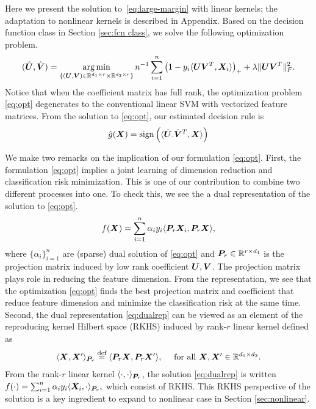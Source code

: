\documentclass[12pt]{article}
\begin{document}
Here we present the solution to~\eqref{eq:large-margin} with linear kernels; the adaptation to nonlinear kernels is described in Appendix. Based on the decision function class in Section \ref{sec:fcn class}, we solve the following optimization problem.
\begin{align}
\label{eq:opt}
(\hat {\bm{U}},\hat {\bm{V}}) = \operatorname*{arg\,min}_{\{(\bm{U},\bm{V})\in\mathbb{R}^{d_1\times r}\times \mathbb{R}^{d_2\times r}\}}n^{-1}\sum_{i=1}^n \left(1-y_i\langle \bm{U}\bm{V}^T,\bm X_i\rangle\right)_++\lambda \lVert\bm{U}\bm{V}^T\rVert_F^2.
\end{align}
Notice that when the coefficient matrix has full rank, the optimization problem \eqref{eq:opt} degenerates to the conventional linear SVM with vectorized feature matrices. From the solution to \eqref{eq:opt}, our estimated decision rule is \begin{align}\hat g(\bm X) = \text{sign}\left(\langle \hat{\bm{U}}. \hat{\bm{V}}^T,\bm X\rangle\right)\end{align}

We make two remarks on the implication of our formulation \eqref{eq:opt}.
First, the formulation \eqref{eq:opt} implies a joint learning of dimension reduction and classification risk minimization. This is one of our contribution to combine two different processes into one. To check this, we see the a dual representation of the solution to \eqref{eq:opt}.
\begin{align}\label{eq:dualrep}
f(\bm X) = \sum_{i=1}^n \alpha_i y_i\langle \bm{P}_r\bm X_i, \bm{P}_r \bm X\rangle,
\end{align}
where $\{\alpha_i\}_{i=1}^n$ are  (sparse) dual solution of \eqref{eq:opt} and $\bm{P}_r\in\mathbb{R}^{r\times d_1}$ is the projection matrix induced by low rank coefficient $\bm{U},\bm{V}$. 
The projection matrix plays role in reducing the feature dimension.  From the representation, we see that the optimization \eqref{eq:opt} finds the best projection matrix and coefficient that reduce feature dimension and minimize the classification risk at the same time.
Second, the dual representation \eqref{eq:dualrep} can be viewed as an element of the reproducing kernel Hilbert space (RKHS) induced by rank-$r$ linear kernel defined as
\begin{align}\label{eq:linear kernel}
\langle \bm X,\bm X'\rangle_{\bm{P}_r} \stackrel{\text{def}}{=}\langle \bm{P}_r\bm X,\bm{P}_r\bm X'\rangle, \quad\text{ for all } \bm X,\bm X'\in\mathbb{R}^{d_1\times d_2}.
\end{align}
From the rank-$r$ linear kernel $\langle \cdot,\cdot\rangle_{\bm{P}_r}$, the solution \eqref{eq:dualrep} is written $f(\cdot) = \sum_{i=1}^n \alpha_iy_i\langle\bm X_i,\cdot\rangle_{\bm{P}_r},$ which consist of RKHS.  This RKHS perspective of the solution is a key ingredient to expand to nonlinear case in Section \ref{sec:nonlinear}.
\end{document}
